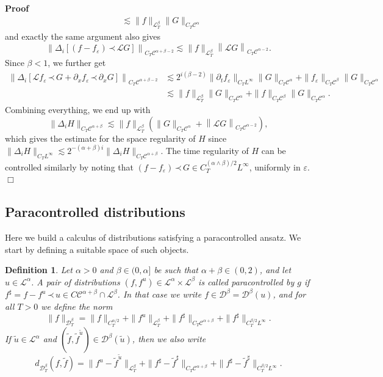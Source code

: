 \documentclass[a4paper,11pt]{article}
\newcommand{\nocomma}{}
\newcommand{\tmtextit}[1]{{\itshape{#1}}}
\newenvironment{proof}{\noindent\textbf{Proof\ }}{\hspace*{\fill}$\Box$\medskip}
\newtheorem{definition}{Definition}
{\theorembodyfont{\rmfamily}\newtheorem{example}{Example}}
{\theorembodyfont{\rmfamily\small}\newtheorem{exercise}{Exercise}}
\newcommand{\LL}{\mathscr{L}}
\newcommand{\CC}{\mathscr{C}}
\newcommand{\CD}{\mathscr{D}}
\newcommand{\DD}{\mathscr{D}}
\newcommand{\lpara}{\,\mathord{\prec}\,}
\begin{document}
\begin{proof}
\begin{align*}
     & \lesssim \| f \|_{\LL_T^{\beta}} \| G \|_{C_T \CC^{\alpha}}
  \end{align*}
  and exactly the same argument also gives
  \[ \left\| \Delta_i \left[ (f - f_{\varepsilon}) \lpara \LL G \right]
     \right\|_{C_T \CC^{\alpha + \beta - 2}} \lesssim \| f \|_{\LL_T^{\beta}}
     \left\| \LL G \right\|_{C_T \CC^{\alpha - 2}} . \]
  Since $\beta < 1$, we further get
  \begin{align*}
     \left\| \Delta_i \left[ \LL f_{\varepsilon} \lpara G + \partial_x f_{\varepsilon} \lpara \partial_x G \right] \right\|_{C_T \CC^{\alpha + \beta - 2}} & \lesssim 2^{i (\beta - 2)} \| \partial_t f_{\varepsilon} \|_{C_T L^{\infty}} \| G \|_{C_T \CC^{\alpha}} + \| f_{\varepsilon}  \|_{C_T \CC^{\beta}} \| G \|_{C_T \CC^{\alpha}} \\
     & \lesssim \| f \|_{\LL_T^{\beta}} \| G \|_{C_T \CC^{\alpha}} + \| f \|_{C_T \CC^{\beta}} \| G \|_{C_T \CC^{\alpha}}.
  \end{align*}
  Combining everything, we end up with
  \[ \| \Delta_i H \|_{C_T \CC^{\alpha + \beta}} \lesssim \| f
     \|_{\LL^{\beta}_T} \left( \| G \|_{C_T \CC^{\alpha}} + \left\| \LL G
     \right\|_{C_T \CC^{\alpha - 2}} \right), \]
  which gives the estimate for the space regularity of $H$ since $\| \Delta_i
  H \|_{C_T L^{\infty}} \lesssim 2^{- (\alpha + \beta) i} \| \Delta_i H
  \|_{C_T \CC^{\alpha + \beta}}$. The time regularity of $H$ can be controlled
  similarly by noting that $(f - f_{\varepsilon}) \lpara G \in C^{(\alpha
  \wedge \beta) / 2}_T L^{\infty}$, uniformly in $\varepsilon$. 
\end{proof}

\subsection{Paracontrolled distributions}

Here we build a calculus of distributions satisfying a paracontrolled ansatz.
We start by defining a suitable space of such objects.

\begin{definition}
  \label{def:paracontrolled parabolic}Let $\alpha > 0$ and $\beta \in (0,
  \alpha]$ be such that $\alpha + \beta \in (0, 2)$, and let $u \in
  \LL^{\alpha}$. A pair of distributions $(f, f^u) \in \LL^{\alpha} \times
  \LL^{\beta}$ is called \tmtextit{paracontrolled} by $g$ if $f^{\sharp} = f -
  f^u \lpara u \in C \CC^{\alpha + \beta} \cap \LL^{\beta}$. In that case we
  write $f \in \CD^{\beta} = \CD^{\beta} (u)$, and for all $T > 0$ we define
  the norm
  \[ \| f \|_{\DD_T^{\beta}} = \| f \|_{C^{\alpha / 2}_T} + \| f^u
     \|_{\LL^{\beta}_T} + \| f^{\sharp} \|_{C_T \CC^{\alpha + \beta}} + \|
     f^{\sharp} \|_{C_T^{\beta / 2} L^{\infty}} . \]
  If $\tilde{u} \in \LL^{\alpha}$ and $(\tilde{f}, \tilde{f}^{\tilde{u}}) \in
  \DD^{\beta} (\tilde{u}) \nocomma$, then we also write
  \[ d_{\DD^{\beta}_T} (f, \tilde{f}) = \| f^u - \tilde{f}^{\tilde{u}}
     \|_{\LL^{\beta}_T} + \|f^{\sharp} - \tilde{f}^{\sharp} \|_{C_T
     \CC^{\alpha + \beta}} + \|f^{\sharp} - \tilde{f}^{\sharp} \|_{C_T^{\beta
     / 2} L^{\infty}} . \]
\end{definition}
\end{document}
